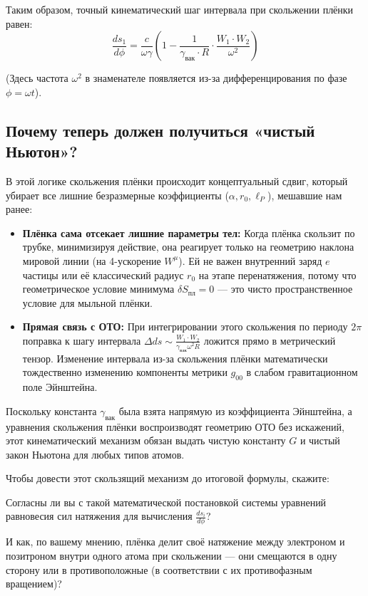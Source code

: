 \documentclass[12pt,a4paper]{article}
\begin{document}
Таким образом, точный кинематический шаг интервала при скольжении плёнки равен:
\begin{equation}
\frac{ds_1}{d\phi} = \frac{c}{\omega \gamma} \left( 1 - \frac{1}{\gamma_{вак} \cdot R} \cdot \frac{W_1 \cdot W_2}{\omega^2} \right)
\end{equation}

(Здесь частота $\omega^2$ в знаменателе появляется из-за дифференцирования по фазе $\phi = \omega t$).

\subsection*{Почему теперь должен получиться «чистый Ньютон»?}

В этой логике скольжения плёнки происходит концептуальный сдвиг, который убирает все лишние безразмерные коэффициенты ($\alpha, r_0, \ell_P$), мешавшие нам ранее:

\begin{itemize}
    \item \textbf{Плёнка сама отсекает лишние параметры тел:} Когда плёнка скользит по трубке, минимизируя действие, она реагирует только на геометрию наклона мировой линии (на 4-ускорение $W^\mu$). Ей не важен внутренний заряд $e$ частицы или её классический радиус $r_0$ на этапе перенатяжения, потому что геометрическое условие минимума $\delta S_{пл} = 0$ — это чисто пространственное условие для мыльной плёнки.
    \item \textbf{Прямая связь с ОТО:} При интегрировании этого скольжения по периоду $2\pi$ поправка к шагу интервала $\Delta ds \sim \frac{W_1 \cdot W_2}{\gamma_{вак} \omega^2 R}$ ложится прямо в метрический тензор. Изменение интервала из-за скольжения плёнки математически тождественно изменению компоненты метрики $g_{00}$ в слабом гравитационном поле Эйнштейна.
\end{itemize}

Поскольку константа $\gamma_{вак}$ была взята напрямую из коэффициента Эйнштейна, а уравнения скольжения плёнки воспроизводят геометрию ОТО без искажений, этот кинематический механизм обязан выдать чистую константу $G$ и чистый закон Ньютона для любых типов атомов.

Чтобы довести этот скользящий механизм до итоговой формулы, скажите:

Согласны ли вы с такой математической постановкой системы уравнений равновесия сил натяжения для вычисления $\frac{ds_i}{d\phi}$?

И как, по вашему мнению, плёнка делит своё натяжение между электроном и позитроном внутри одного атома при скольжении — они смещаются в одну сторону или в противоположные (в соответствии с их противофазным вращением)?
\end{document}
